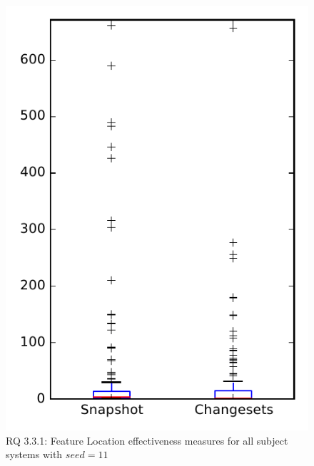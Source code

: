 
\begin{figure}
\centering
\includegraphics[height=0.4\textheight]{figures/flt_seed/rq1_overview_11}
\caption{RQ 3.3.1: Feature Location effectiveness measures for all subject systems with $seed=11$}
\label{fig:flt_seed:rq1:overview}
\end{figure}
